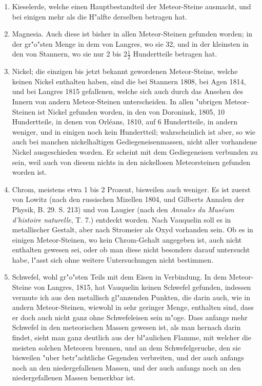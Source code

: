 \documentclass[a4paper, 11pt, oneside, polutonikogreek, german]{article}
\begin{document}
\begin{enumerate}
\begin{enumerate}
   \end{enumerate}
  \item Kieselerde, welche einen Hauptbestandteil der Meteor-Steine ausmacht, und bei einigen mehr als die H"alfte derselben betragen hat.
  \item Magnesia. Auch diese ist bisher in allen Meteor-Steinen gefunden worden; in der gr"o"sten Menge in dem von Langres, wo sie 32, und in der kleinsten in den von Stannern, wo sie nur 2 bis $\mathfrak{2\frac{1}{2}}$ Hundertteile betragen hat.
  \item Nickel; die einzigen bis jetzt bekannt gewordenen Meteor-Steine, welche keinen Nickel enthalten haben, sind die bei Stannern 1808, bei Agen 1814, und bei Langres 1815 gefallenen, welche sich auch durch das Ansehen des Innern von andern Meteor-Steinen unterscheiden. In allen "ubrigen Meteor-Steinen ist Nickel gefunden worden, in den von Doroninsk, 1805, 10 Hundertteile, in denen von Orléans, 1810, auf 6 Hundertteile, in andern weniger, und in einigen noch kein Hundertteil; wahrscheinlich ist aber, so wie auch bei manchen nickelhaltigen Gediegeneisenmassen, nicht aller vorhandene Nickel ausgeschieden worden. Er scheint mit dem Gediegeneisen verbunden zu sein, weil auch von diesem nichts in den nickellosen Meteorsteinen gefunden worden ist.
  \item Chrom, meistens etwa 1 bis 2 Prozent, bisweilen auch weniger. Es ist zuerst von Lowitz (nach den russischen Mizellen 1804, und Gilberts Annalen der Physik, B. 29. S. 213) und von Laugier (nach den \emph{Annales du Muséum d'histoire naturelle}, T. 7.) entdeckt worden. Nach Vauquelin soll es in metallischer Gestalt, aber nach Stromeier als Oxyd vorhanden sein. Ob es in einigen Meteor-Steinen, wo kein Chrom-Gehalt angegeben ist, auch nicht enthalten gewesen sei, oder ob man diese nicht besonders darauf untersucht habe, l"asst sich ohne weitere Untersuchungen nicht bestimmen.
  \item Schwefel, wohl gr"o"sten Teils mit dem Eisen in Verbindung. In dem Meteor-Steine von Langres, 1815, hat Vauquelin keinen Schwefel gefunden, indessen vermute ich aus den metallisch gl"anzenden Punkten, die darin auch, wie in andern Meteor-Steinen, wiewohl in sehr geringer Menge, enthalten sind, dass er doch auch nicht ganz ohne Schwefeleisen sein m"oge. Dass anfangs mehr Schwefel in den meteorischen Massen gewesen ist, als man hernach darin findet, sieht man ganz deutlich aus der bl"aulichen Flamme, mit welcher die meisten solchen Meteoren brennen, und an dem Schwefelgeruche, den sie bisweilen "uber betr"achtliche Gegenden verbreiten, und der auch anfangs noch an den niedergefallenen Massen, und der auch anfangs noch an den niedergefallenen Massen bemerkbar ist.

\end{enumerate}
\end{document}
